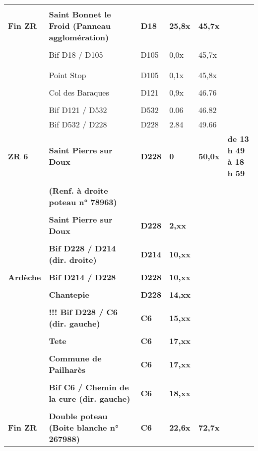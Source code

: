 \documentclass{article}%
\begin{document}
\begin{longtable}{p{2.25cm}|p{7.0cm}|p{1.5cm}|p{1.5cm}|p{1.5cm}|p{3.5cm}}
 & & & & & \\%
\textbf{Fin ZR }&\textbf{Saint Bonnet le Froid (Panneau agglomération) }&\textbf{D18 }&\textbf{25,8x}&\textbf{45,7x}& \\%
 & & & & & \\%
 &Bif D18 / D105&D105&0,0x&45,7x& \\%
 & & & & & \\%
\hline& & & & & \\%
 &Point Stop &D105 &0,1x&45,8x& \\%
 & & & & & \\%
 &Col des Baraques&D121&0,9x&46.76& \\%
 & & & & & \\%
 &Bif D121 / D532&D532&0.06&46.82& \\%
 &Bif D532 / D228&D228&2.84&49.66& \\%
\textbf{ZR 6}&\textbf{Saint Pierre sur Doux  }&\textbf{D228}&\textbf{0}&\textbf{50,0x}&\textbf{de 13 h 49 à 18 h 59}\\%
 & & & & & \\%
\textbf{  }&\textbf{(Renf. à droite poteau n° 78963) }& & & & \\%
 & & & & & \\%
 &\textbf{Saint Pierre sur Doux}&\textbf{D228}&\textbf{2,xx}& & \\%
 & & & & & \\%
 &\textbf{Bif D228 / D214 (dir. droite)}&\textbf{D214 }&\textbf{10,xx}& & \\%
 & & & & & \\%
\textbf{Ardèche}&\textbf{Bif D214 / D228}&\textbf{D228}&\textbf{10,xx}& & \\%
 & & & & & \\%
 &\textbf{Chantepie}&\textbf{D228}&\textbf{14,xx}& & \\%
 & & & & & \\%
 &\textbf{!!! Bif D228 / C6 (dir. gauche)}&\textbf{C6}&\textbf{15,xx}& & \\%
 & & & & & \\%
 &\textbf{Tete}&\textbf{C6}&\textbf{17,xx}& & \\%
 & & & & & \\%
 &\textbf{Commune de Pailharès}&\textbf{C6 }&\textbf{17,xx}& & \\%
 & & & & & \\%
 &\textbf{Bif C6 / Chemin de la cure (dir. gauche)}&\textbf{C6}&\textbf{18,xx}& & \\%
 & & & & & \\%
\textbf{Fin ZR }&\textbf{Double poteau (Boite blanche n° 267988)}&\textbf{C6}&\textbf{22,6x}&\textbf{72,7x}& \\%

\end{longtable}
\end{document}
